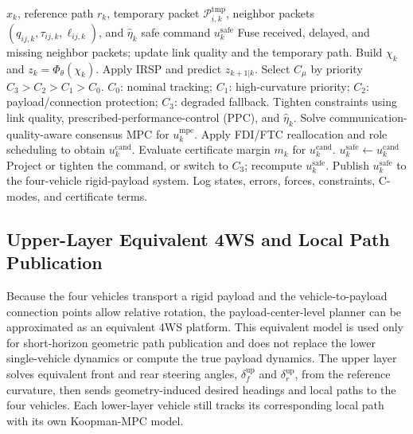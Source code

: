 \documentclass[twocolumn,3p,times,procedia]{elsarticle}
\newcommand{\Method}{NR-KDCC}
\begin{document}
\begin{algorithm}[t]
\scriptsize
\caption{Online safe-command generation in \Method{}.}
\label{alg:nrkdcc_safe_command}
\begin{algorithmic}[1]
\Require $x_k$, reference path $r_k$, temporary packet $\mathcal P_{i,k}^{\mathrm{tmp}}$, neighbor packets $(q_{ij,k},\tau_{ij,k},\ell_{ij,k})$, and $\hat\eta_k$
\Ensure safe command $u_k^{\mathrm{safe}}$
\State Fuse received, delayed, and missing neighbor packets; update link quality and the temporary path.
\State Build $\chi_k$ and $z_k=\Phi_\theta(\chi_k)$.
\State Apply IRSP and predict $z_{k+1|k}$.
\State Select $C_\mu$ by priority $C_3>C_2>C_1>C_0$.
\Statex \hspace{\algorithmicindent}$C_0$: nominal tracking; $C_1$: high-curvature priority; $C_2$: payload/connection protection; $C_3$: degraded fallback.
\State Tighten constraints using link quality, prescribed-performance-control (PPC), and $\hat\eta_k$.
\State Solve communication-quality-aware consensus MPC for $u_k^{\mathrm{mpc}}$.
\State Apply FDI/FTC reallocation and role scheduling to obtain $u_k^{\mathrm{cand}}$.
\State Evaluate certificate margin $m_k$ for $u_k^{\mathrm{cand}}$.
\State $u_k^{\mathrm{safe}}\gets u_k^{\mathrm{cand}}$
\Else
\State Project or tighten the command, or switch to $C_3$; recompute $u_k^{\mathrm{safe}}$.
\EndIf
\State Publish $u_k^{\mathrm{safe}}$ to the four-vehicle rigid-payload system.
\State Log states, errors, forces, constraints, C-modes, and certificate terms.
\end{algorithmic}
\end{algorithm}

\subsection{Upper-Layer Equivalent 4WS and Local Path Publication}

Because the four vehicles transport a rigid payload and the vehicle-to-payload connection points allow relative rotation, the payload-center-level planner can be approximated as an equivalent 4WS platform. This equivalent model is used only for short-horizon geometric path publication and does not replace the lower single-vehicle dynamics or compute the true payload dynamics. The upper layer solves equivalent front and rear steering angles, $\delta_f^{\mathrm{up}}$ and $\delta_r^{\mathrm{up}}$, from the reference curvature, then sends geometry-induced desired headings and local paths to the four vehicles. Each lower-layer vehicle still tracks its corresponding local path with its own Koopman-MPC model.
\end{document}
